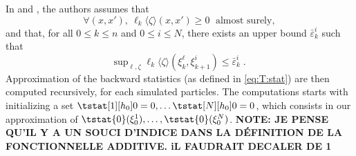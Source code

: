 \documentclass{article}
\newcommand{\af}[1]{h_{#1}}
\newcommand{\addf}[1]{\termletter_{#1}}
\newcommand{\termletter}{\tilde{h}}
\newcommand{\N}{N}
\newcommand{\hkup}{\bar{\varepsilon}}
\newcommand{\eqsp}{\;}
\newcommand{\epart}[2]{\ensuremath{\xi_{#1}^{#2}}}
\newcommand{\hatqg}[1]{\mathsf{\ell}_{#1}}
\begin{document}
In \cite{gloaguen2018online} and \cite{gloaguen2019pseudo}, the authors assumes that
\begin{equation}
\forall(x, x'), ~\hatqg{k}\langle \zeta\rangle(x, x')\geqslant 0\eqsp \text{ almost surely}, \label{eq:positive:estimate}
\end{equation}
and that, for all  $0\leqslant k\leqslant n$ and $0\leqslant i\leqslant N$, there exists an upper bound $\hkup^i_k$  such that
\begin{equation}
\mathrm{sup}_{\ell,\zeta}\;\hatqg{k}\langle \zeta\rangle(\epart{k}{\ell},\epart{k+1}{i})\leqslant \hkup^i_k\eqsp. \label{eq:AR:bound}
\end{equation}
Approximation of the backward statistics (as defined in \eqref{eq:T:stat}) are then computed recursively, for each simulated particles. 
The computations starts with initializing a set $\tstat[1][\af{0}]{0} = 0,\dots \tstat[N][\af{0}]{0} = 0$, which consists in our approximation of $\tstat{0}(\epart{0}{1}), \dots, \tstat{0}(\epart{0}{N})$. \textbf{NOTE: JE PENSE QU'IL Y A UN SOUCI D'INDICE DANS LA DÉFINITION DE LA FONCTIONNELLE ADDITIVE. iL FAUDRAIT DECALER DE 1} 
\end{document}
